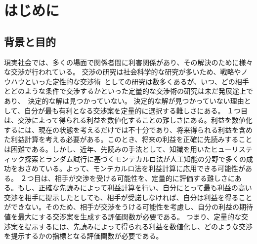 \documentclass[a4, 10pt,dvipdfmx]{jsarticle}
\begin{document}
\section{はじめに}

\subsection{背景と目的}

現実社会では、多くの場面で関係者間に利害関係があり、その解決のために様々な交渉が行われている。
交渉の研究は社会科学的な研究が多いため、戦略やノウハウといった定性的な交渉術~\cite{fisher2011,lewicki2001essentials,岡紀子2002視点}としての研究は数多くあるが、いつ、どの相手とどのような条件で交渉するかといった定量的な交渉術の研究は未だ発展途上であり、~\cite{安村禎明2002モノポリーゲームにおける交渉エージェント}決定的な解は見つかっていない。
決定的な解が見つかっていない理由として、自分が最も有利となる交渉案を定量的に選択する難しさにある。
１つ目は、交渉によって得られる利益を数値化することの難しさにある。利益を数値化するには、現在の状態を考えるだけでは不十分であり、将来得られる利益を含めた利益計算を考える必要がある。このとき、将来の利益を正確に先読みすることは困難である。しかし、近年、先読みの手法として、知識を用いたヒューリスティック探索とランダム試行に基づくモンテカルロ法が人工知能の分野で多くの成功をおさめている。よって、モンテカルロ法を利益計算に応用できる可能性がある。
２つ目は、相手が交渉を受ける可能性を、定量的に評価する難しさにある。もし、正確な先読みによって利益計算を行い、自分にとって最も利益の高い交渉を相手に提示したとしても、相手が受諾しなければ、自分は利益を得ることができない。そのため、相手が交渉をうける可能性を考慮し、自分の利益の期待値を最大にする交渉案を生成する評価関数が必要である。
つまり、定量的な交渉案を提示するには、先読みによって得られる利益を数値化し、どのような交渉を提示するかの指標となる評価関数が必要である。
\end{document}
